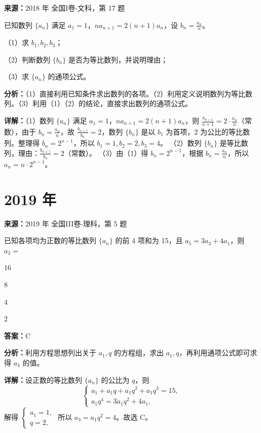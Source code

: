 \begin{question}[points=12]
\textbf{来源：}2018 年 全国I卷-文科，第 17 题\par
已知数列 $\{a_n\}$ 满足 $a_1=1$，$na_{n+1}=2(n+1)a_n$，设 $b_n=\frac{a_n}{n}$。

（1）求 $b_1,b_2,b_3$；

（2）判断数列 $\{b_n\}$ 是否为等比数列，并说明理由；

（3）求 $\{a_n\}$ 的通项公式。
\begin{solution}

\textbf{分析：}（1）直接利用已知条件求出数列的各项。（2）利用定义说明数列为等比数列。（3）利用（1）（2）的结论，直接求出数列的通项公式。

\textbf{详解：}（1）数列 $\{a_n\}$ 满足 $a_1=1$，$na_{n+1}=2(n+1)a_n$，则 $\frac{a_{n+1}}{n+1}=2\cdot\frac{a_n}{n}$（常数），由于 $b_n=\frac{a_n}{n}$，故 $\frac{b_{n+1}}{b_n}=2$，数列 $\{b_n\}$ 是以 $b_1$ 为首项，$2$ 为公比的等比数列。整理得 $b_n=2^{n-1}$，所以 $b_1=1,b_2=2,b_3=4$。
（2）数列 $\{b_n\}$ 是等比数列，理由：$\frac{b_{n+1}}{b_n}=2$（常数）。
（3）由（1）得 $b_n=2^{n-1}$，根据 $b_n=\frac{a_n}{n}$，所以 $a_n=n\cdot2^{n-1}$。
\end{solution}
\end{question}

\section*{2019 年}

\begin{question}[points=5]
\textbf{来源：}2019 年 全国III卷-理科，第 5 题\par
已知各项均为正数的等比数列 $\{a_n\}$ 的前 4 项和为 15，且 $a_5=3a_3+4a_1$，则 $a_3=$
\begin{choices}
  \item $16$
  \item $8$
  \item $4$
  \item $2$
\end{choices}
\begin{solution}
\textbf{答案：}C

\textbf{分析：}利用方程思想列出关于 $a_1,q$ 的方程组，求出 $a_1,q$，再利用通项公式即可求得 $a_3$ 的值。

\textbf{详解：}设正数的等比数列 $\{a_n\}$ 的公比为 $q$，则
$$\begin{cases} a_1 + a_1q + a_1q^2 + a_1q^3 = 15, \\ a_1q^4 = 3a_1q^2 + 4a_1, \end{cases}$$
解得 $\begin{cases} a_1 = 1, \\ q = 2, \end{cases}$ 所以 $a_3 = a_1q^2 = 4$。故选 C。
\end{solution}
\end{question}

